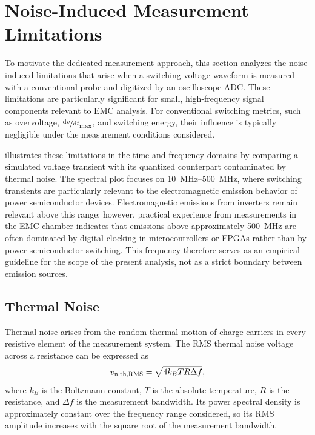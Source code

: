 \section{Noise-Induced Measurement Limitations}
\label{sec:MeasurementLimitation}

To motivate the dedicated measurement approach, this section analyzes the noise-induced limitations that arise when a switching voltage waveform is measured with a conventional probe and digitized by an oscilloscope ADC\@.
These limitations are particularly significant for small, high-frequency signal components relevant to EMC analysis.
For conventional switching metrics, such as overvoltage, $\sfrac{\textnormal{d}v}{\textnormal{d}t}_\text{max}$, and switching energy, their influence is typically negligible under the measurement conditions considered.

 illustrates these limitations in the time and frequency domains by comparing a simulated voltage transient with its quantized counterpart contaminated by thermal noise.
The spectral plot focuses on \SIrange{10}{500}{MHz}, where switching transients are particularly relevant to the electromagnetic emission behavior of power semiconductor devices.
Electromagnetic emissions from inverters remain relevant above this range; however, practical experience from measurements in the EMC chamber indicates that emissions above approximately \SI{500}{MHz} are often dominated by digital clocking in microcontrollers or FPGAs rather than by power semiconductor switching.
This frequency therefore serves as an empirical guideline for the scope of the present analysis, not as a strict boundary between emission sources.


\subsection{Thermal Noise}

Thermal noise arises from the random thermal motion of charge carriers in every resistive element of the measurement system.
The RMS thermal noise voltage across a resistance can be expressed as
\begin{equation}
	{v}_{\mathrm{n,th,RMS}} = \sqrt{4 k_B T R \Delta f},
\end{equation}
where $k_B$ is the Boltzmann constant, $T$ is the absolute temperature, $R$ is the resistance, and $\Delta f$ is the measurement bandwidth.
Its power spectral density is approximately constant over the frequency range considered, so its RMS amplitude increases with the square root of the measurement bandwidth.

